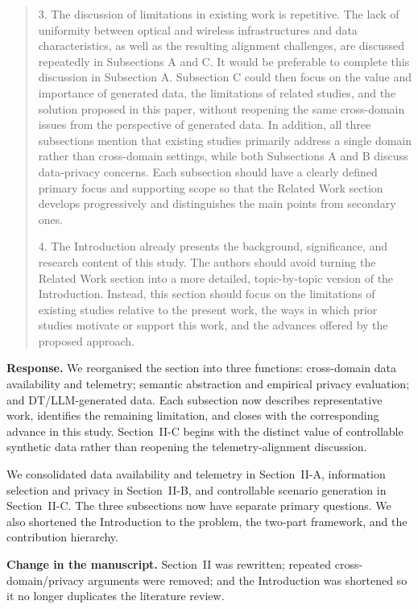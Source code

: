 \documentclass[11pt]{article}
\newenvironment{reviewercomment}{\begin{quote}\color{reviewblue}}{\end{quote}}
\newenvironment{authorresponse}{\color{responsegreen}\textbf{Response.} }{\par\color{black}}
\newcommand{\change}[1]{\par\textbf{Change in the manuscript.} #1\par}
\begin{document}
\begin{reviewercomment}
3. The discussion of limitations in existing work is repetitive. The lack of uniformity between optical and wireless infrastructures and data characteristics, as well as the resulting alignment challenges, are discussed repeatedly in Subsections A and C. It would be preferable to complete this discussion in Subsection A. Subsection C could then focus on the value and importance of generated data, the limitations of related studies, and the solution proposed in this paper, without reopening the same cross-domain issues from the perspective of generated data. In addition, all three subsections mention that existing studies primarily address a single domain rather than cross-domain settings, while both Subsections A and B discuss data-privacy concerns. Each subsection should have a clearly defined primary focus and supporting scope so that the Related Work section develops progressively and distinguishes the main points from secondary ones.

4. The Introduction already presents the background, significance, and research content of this study. The authors should avoid turning the Related Work section into a more detailed, topic-by-topic version of the Introduction. Instead, this section should focus on the limitations of existing studies relative to the present work, the ways in which prior studies motivate or support this work, and the advances offered by the proposed approach.
\end{reviewercomment}
\begin{authorresponse}
We reorganised the section into three functions: cross-domain data availability and telemetry; semantic abstraction and empirical privacy evaluation; and DT/LLM-generated data. Each subsection now describes representative work, identifies the remaining limitation, and closes with the corresponding advance in this study. Section~II-C begins with the distinct value of controllable synthetic data rather than reopening the telemetry-alignment discussion.

We consolidated data availability and telemetry in Section~II-A, information selection and privacy in Section~II-B, and controllable scenario generation in Section~II-C. The three subsections now have separate primary questions. We also shortened the Introduction to the problem, the two-part framework, and the contribution hierarchy.
\end{authorresponse}
\change{Section~II was rewritten; repeated cross-domain/privacy arguments were removed; and the Introduction was shortened so it no longer duplicates the literature review.}
\end{document}
